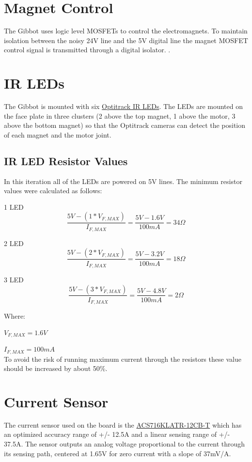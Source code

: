 \documentclass{article}
\begin{document}
\section{Magnet Control}
The Gibbot uses logic level MOSFETs to control the electromagnets. To maintain isolation between the noisy 24V line and the 5V digital line the magnet MOSFET control signal is transmitted through a digital isolator. .

\section{IR LEDs}
The Gibbot is mounted with six \href{http://www.naturalpoint.com/optitrack/static/documents/850\%20nm\%20IR\%20LED\%20Data\%20Sheet.pdf}{Optitrack IR LEDs}.
The LEDs are mounted on the face plate in three clusters (2 above the top magnet, 1 above the motor, 3 above the bottom magnet) so that the Optitrack cameras can detect the position of each magnet and the motor joint. 
\subsection{IR LED Resistor Values}
In this iteration all of the LEDs are powered on 5V lines. The minimum resistor values were calculated as follows:
\begin{description}
\item{1 LED}
\[\frac{5V-(1*V_{F,MAX})}{I_{F,MAX}}=\frac{5V-1.6V}{100mA} = 34\Omega\]
\item{2 LED}
\[\frac{5V-(2*V_{F,MAX})}{I_{F,MAX}}=\frac{5V-3.2V}{100mA} = 18\Omega\]
\item{3 LED}
\[\frac{5V-(3*V_{F,MAX})}{I_{F,MAX}}=\frac{5V-4.8V}{100mA} = 2\Omega\]
\end{description}
Where:

$V_{F,MAX} =1.6V$

$I_{F,MAX} =100mA$\\
To avoid the risk of running maximum current through the resistors these value should be increased by about 50\%.

\section{Current Sensor}
The current sensor used on the board is the
 \href{file:///Users/ajgriesemer/Downloads/ACS716-Datasheet%20(1).pdf}{ACS716KLATR-12CB-T}
which has an optimized accuracy range of +/- 12.5A and a linear sensing range of +/- 37.5A. The sensor outputs an analog voltage proportional to the current through its sensing path, centered at 1.65V for zero current with a slope of 37mV/A.
\end{document}
